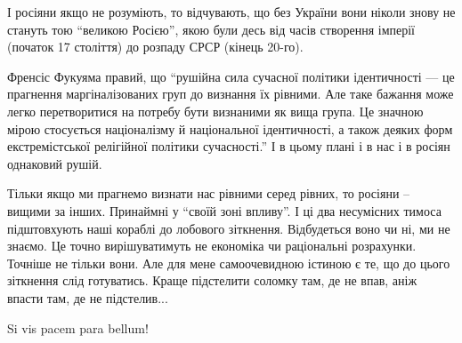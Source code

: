 І росіяни якщо не розуміють, то відчувають, що без України вони ніколи знову не
стануть тою \enquote{великою Росією}, якою були десь від часів створення імперії
(початок 17 століття) до розпаду СРСР (кінець 20-го). 

Френсіс Фукуяма правий, що \enquote{рушійна сила сучасної політики ідентичності — це
прагнення маргіналізованих груп до визнання їх рівними. Але таке бажання може
легко перетворитися на потребу бути визнаними як вища група. Це значною мірою
стосується націоналізму й національної ідентичності, а також деяких форм
екстремістської релігійної політики сучасності.} І в цьому плані і в нас і в
росіян однаковий рушій.

Тільки якщо ми прагнемо визнати нас рівними серед рівних, то росіяни – вищими
за інших. Принаймні у \enquote{своїй зоні впливу}. І ці два несумісних тимоса
підштовхують наші кораблі до лобового зіткнення. Відбудеться воно чи ні, ми не
знаємо. Це точно вирішуватимуть не економіка чи раціональні розрахунки. Точніше
не тільки вони. Але для мене самоочевидною істиною є те, що до цього зіткнення
слід готуватись. Краще підстелити соломку там, де не впав, аніж впасти там, де
не підстелив...

Si vis pacem para bellum!
